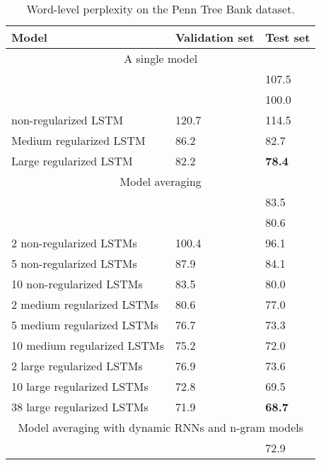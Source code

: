 \documentclass{article} %
\begin{document}
\begin{table}[t]
  \small
  \centering
  \renewcommand{\arraystretch}{1.15}
  \begin{tabular}{lll}
    \hline
     Model & Validation set & Test set \\
    \hline
    \multicolumn{3}{c}{A single model} \\
    \hline
    \citet{pascanu2013construct} & & 107.5 \\
    \citet{chenglanguage} & & 100.0 \\
    non-regularized LSTM & 120.7 & 114.5 \\
    Medium regularized LSTM & 86.2 & 82.7 \\
    Large regularized LSTM & 82.2 & {\bf 78.4} \\
    \hline
    \multicolumn{3}{c}{Model averaging} \\
    \hline
    \citet{mikolov2012statistical} & & 83.5 \\
    \citet{chenglanguage} & & 80.6 \\
    2 non-regularized LSTMs & 100.4 & 96.1 \\
    5 non-regularized LSTMs & 87.9 & 84.1 \\
    10 non-regularized LSTMs & 83.5 & 80.0 \\
    2 medium regularized LSTMs & 80.6 & 77.0 \\
    5 medium regularized LSTMs & 76.7 & 73.3 \\
    10 medium regularized LSTMs & 75.2 & 72.0 \\
    2 large regularized LSTMs & 76.9 & 73.6 \\
    10 large regularized LSTMs & 72.8 & 69.5 \\
    38 large regularized LSTMs & 71.9 & {\bf 68.7} \\
    \hline
    \multicolumn{3}{c}{Model averaging with dynamic RNNs and n-gram models} \\
    \hline
    \citet{mikolov2012context} & & 72.9 \\
    \hline
  \end{tabular}
  \caption{Word-level perplexity on the Penn Tree Bank dataset.}
  \label{tab:ptb}
\end{table}
\end{document}
